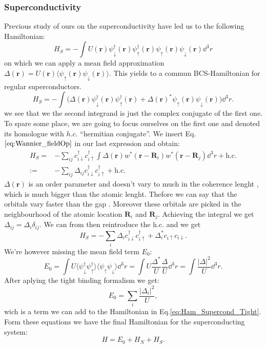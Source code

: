 \documentclass[../main.tex]{subfile}
\begin{document}
\subsubsection{Superconductivity}
Previous study of ours on the superconductivity have led us to the following Hamiltonian:
\[
    H_S = - \int U(\bm{r}) \psi_{\downarrow}^{\dagger}(\bm{r})\psi_{\uparrow}^{\dagger}(\bm{r})\psi_{\uparrow}(\bm{r})\psi_{\downarrow}(\bm{r}) \dd^3r
\]
on which we can apply a mean field approximation $\Delta(\bm{r}) = U(\bm{r})\langle \psi_{\uparrow}(\bm{r})\psi_{\downarrow}(\bm{r})\rangle$.
This yields to a commun BCS-Hamiltonian for regular superconductors.\\
\[
    H_S = - \int \biggl(\Delta(\bm{r}) \psi_{\downarrow}^{\dagger}(\bm{r})\psi_{\uparrow}^{\dagger}(\bm{r}) + \Delta(\bm{r})^{\ast}\psi_{\uparrow}(\bm{r})\psi_{\downarrow}(\bm{r})\biggr) \dd^3r.
\]  
we see that we the second integrand is just the complex conjugate of the first one. 
To spare some place, we are going to focus ourselves on the first one and denoted its homologue with $h.c.$ ``hermitian conjugate''. We insert Eq.$\ref{eq:Wannier_fieldOp}$ 
in our last expression and obtain:
\begin{align*}
    H_S =& - \sum_{ij} c_{i\downarrow}^{\dagger}c_{i\uparrow}^{\dagger} \int \Delta(\bm{r}) w^{\ast}(\bm{r} - \bm{R}_i) w^{\ast}(\bm{r} - \bm{R}_j) \dd^3r + \text{h.c.}\\
    :=& -\sum_{ij} \Delta_{ij} c_{i\downarrow}^{\dagger}c_{i\uparrow}^{\dagger} + \text{h.c.}
\end{align*}
$\Delta(\bm{r})$ is an order parameter and doesn't vary to much in the coherence lenght , which is much bigger than the atomic lenght.
Thefore we can say that the orbitals vary faster than the gap \cite{Jabir2021}. Moreover these orbitals are picked in the neighbourhood of the atomic location $\bm{R}_i$ and $\bm{R}_j$.
Achieving the integral we get $\Delta_{ij} = \Delta_i \delta_{ij}$. We can from then reintroduce the h.c. and we get
\begin{equation}\label{eq:Ham_Superc    ond_Tight}
    H_S = -\sum_{i} \Delta_i c_{i\downarrow}^{\dagger}c_{i\uparrow}^{\dagger} + \Delta_i^{\ast} c_{i\uparrow}c_{i\downarrow}.
\end{equation}
We're however missing the mean field term $E_0$:
\[
    E_0 = \int U \langle \psi_{\downarrow}^{\dagger}\psi_{\uparrow}^{\dagger}\rangle \langle\psi_{\uparrow}\psi_{\downarrow}\rangle \dd^3r 
    = \int U \frac{\Delta^{\ast}}{U}\frac{\Delta}{U} \dd^3r = \int \frac{|\Delta|^2}{U} \dd^3r.
\]
After aplying the tight binding formalism we get:
\[
    E_0 = \sum_{i} \frac{|\Delta_i|^2}{U},
\]
wich is a term we can add to the Hamiltonian in Eq.\ref{eq:Ham_Supercond_Tight}. Form these equations we have the final 
Hamiltonian for the superconducting system:
\[
    H = E_0 + H_N + H_S.
\]  
\end{document}

